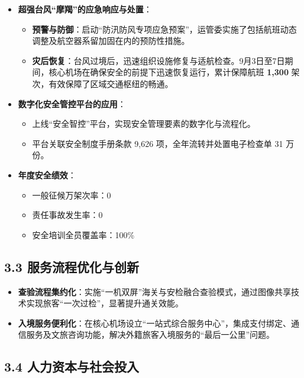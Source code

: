 \documentclass[a4paper,12pt]{article}
\begin{document}
\begin{itemize}
    \item \textbf{超强台风“摩羯”的应急响应与处置}：
    \begin{itemize}
        \item \textbf{预警与防御}：启动“防汛防风专项应急预案”，运管委实施了包括航班动态调整及航空器系留加固在内的预防性措施。
        \item \textbf{灾后恢复}：台风过境后，迅速组织设施修复与适航检查。9月3日至7日期间，核心机场在确保安全的前提下迅速恢复运行，累计保障航班 \textbf{1,300} 架次，有效保障了区域交通枢纽的畅通。
    \end{itemize}
    
    \item \textbf{数字化安全管控平台的应用}：
    \begin{itemize}
        \item 上线“安全智控”平台，实现安全管理要素的数字化与流程化。
        \item 平台关联安全制度手册条款 9,626 项，全年流转并处置电子检查单 31 万份。
    \end{itemize}

    \item \textbf{年度安全绩效}：
    \begin{itemize}
        \item 一般征候万架次率：0
        \item 责任事故发生率：0
        \item 安全培训全员覆盖率：100\% \\
    \end{itemize}
\end{itemize}

\subsection{3.3 服务流程优化与创新}

\begin{itemize}
    \item \textbf{查验流程集约化}：实施“一机双屏”海关与安检融合查验模式，通过图像共享技术实现旅客“一次过检”，显著提升通关效能。
    \item \textbf{入境服务便利化}：在核心机场设立“一站式综合服务中心”，集成支付绑定、通信服务及文旅咨询功能，解决外籍旅客入境服务的“最后一公里”问题。
\end{itemize}

\subsection{3.4 人力资本与社会投入}
\end{document}
